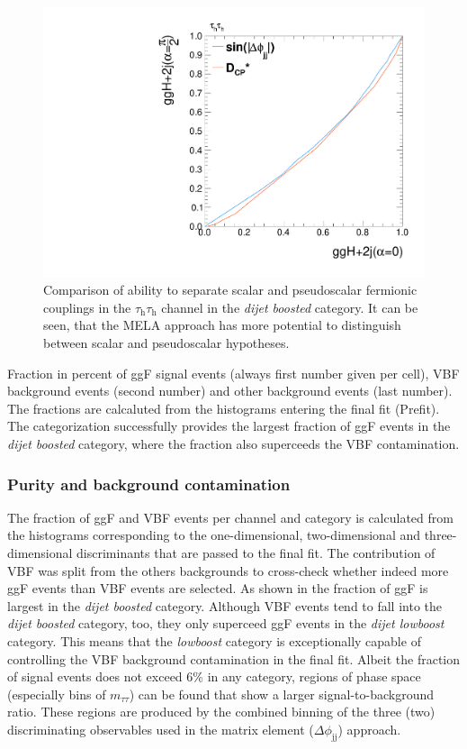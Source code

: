 \begin{figure}[h!]
    \centering
    \includegraphics[width=.5\textwidth]{Figures/eventselection/ROC_curve}
    \caption[Distinguishability of kinematic and \jdphi{} approaches.]{Comparison of ability to separate scalar and pseudoscalar fermionic couplings in the $\tau_\text{h}\tau_\text{h}$ channel in the \textit{dijet boosted} category. 
    It can be seen, that the MELA approach has more potential to distinguish between scalar and pseudoscalar hypotheses.}\label{ES:ROC_curve}
\end{figure}%

\begin{table}[!]
    \centering
    \caption[Signal acceptances and background acceptances of the event categorization.]{Fraction in percent of ggF signal events (always first number given per cell), VBF background events (second number) and other background events (last number). The fractions are calcaluted from the
    histograms entering the final fit (Prefit). The categorization successfully provides the largest fraction of ggF events in the \textit{dijet boosted} category, where the fraction also superceeds the VBF contamination.}\label{ES:purities}
    
\end{table}%
\subsubsection{Purity and background contamination}
The fraction of ggF and VBF events per channel and category is calculated from the histograms corresponding to the one-dimensional, two-dimensional and three-dimensional discriminants that
are passed to the final fit. The contribution of VBF was split from the others backgrounds to cross-check whether indeed more ggF events than VBF events are selected.
As shown in  the fraction of ggF is largest in the \textit{dijet boosted} category. Although VBF events tend to fall into the \textit{dijet boosted} category, too, they only superceed
ggF events in the \textit{dijet lowboost} category. This means that the \textit{lowboost} category is exceptionally capable of controlling the VBF background contamination in the final fit.\newline{}
Albeit the fraction of signal events does not exceed 6\% in any category, regions of phase space (especially bins of $m_{\tau\tau}$) can be found that show a larger signal-to-background ratio. These regions are produced by the combined binning of the three (two) discriminating observables
used in the matrix element ($\Delta\phi_\text{jj}$) approach.


\clearpage
